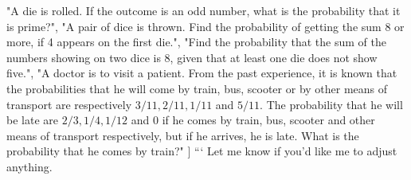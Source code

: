"A die is rolled. If the outcome is an odd number, what is the probability that it is prime?",
"A pair of dice is thrown. Find the probability of getting the sum 8 or more, if 4 appears on the first die.",
"Find the probability that the sum of the numbers showing on two dice is 8, given that at least one die does not show five.",
"A doctor is to visit a patient. From the past experience, it is known that the probabilities that he will come by train, bus, scooter or by other means of transport are respectively $3/11, 2/11, 1/11$ and $5/11$. The probability that he will be late are $2/3, 1/4, 1/12$ and $0$ if he comes by train, bus, scooter and other means of transport respectively, but if he arrives, he is late. What is the probability that he comes by train?"
]
```
Let me know if you'd like me to adjust anything.